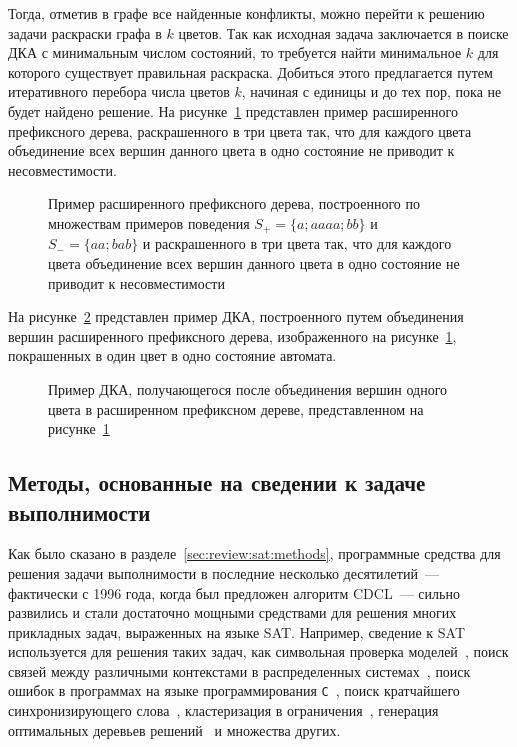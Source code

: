Тогда, отметив в графе все найденные конфликты, можно перейти к решению задачи раскраски графа в $k$ цветов.
Так как исходная задача заключается в поиске ДКА с минимальным числом состояний, то требуется найти минимальное $k$ для которого существует правильная раскраска.
Добиться этого предлагается путем итеративного перебора числа цветов $k$, начиная с единицы и до тех пор, пока не будет найдено решение.
На рисунке~\ref{img:apta-color} представлен пример расширенного префиксного дерева, раскрашенного в три цвета так, что для каждого цвета объединение всех вершин данного цвета в одно состояние не приводит к несовместимости.

\begin{figure}[ht]
  \centering
  \ifafour
    
  \else
    
  \fi
  \caption{Пример расширенного префиксного дерева, построенного по множествам примеров поведения $S_{+}=\{a;aaaa;bb\}$ и $S_{-}=\{aa;bab\}$ и раскрашенного в три цвета так, что для каждого цвета объединение всех вершин данного цвета в одно состояние не приводит к несовместимости}
  \label{img:apta-color}
\end{figure}

На рисунке~\ref{img:dfa-color} представлен пример ДКА, построенного путем объединения вершин расширенного префиксного дерева, изображенного на рисунке~\ref{img:apta-color}, покрашенных в один цвет в одно состояние автомата.

\begin{figure}[ht]
  \centering
  \ifafour
    
  \else
    
  \fi
  \caption{Пример ДКА, получающегося после объединения вершин одного цвета в расширенном префиксном дереве, представленном на рисунке~\ref{img:apta-color}}
  \label{img:dfa-color}
\end{figure}

\subsection{Методы, основанные на сведении к задаче выполнимости}
\label{sec:review:sat-dfa-inf:sat}

Как было сказано в разделе~\ref{sec:review:sat:methods}, программные средства для решения задачи выполнимости в последние несколько десятилетий~--- фактически с 1996 года, когда был предложен алгоритм CDCL~--- сильно развились и стали достаточно мощными средствами для решения многих прикладных задач, выраженных на языке SAT.
Например, сведение к SAT используется для решения таких задач, как символьная проверка моделей~\cite{DBLP:conf/tacas/BiereCCZ99}, поиск связей между различными контекстами в распределенных системах~\cite{DBLP:conf/context/BouquetMSZ03}, поиск ошибок в программах на языке программирования \texttt{C}~\cite{DBLP:conf/cav/XieA05}, поиск кратчайшего синхронизирующего слова~\cite{DBLP:conf/wia/SkvortsovT11}, кластеризация в ограничения~\cite{DBLP:conf/ida/MetivierBCKL12}, генерация оптимальных деревьев решений~\cite{DBLP:conf/ijcai/NarodytskaIPM18} и множества других.


